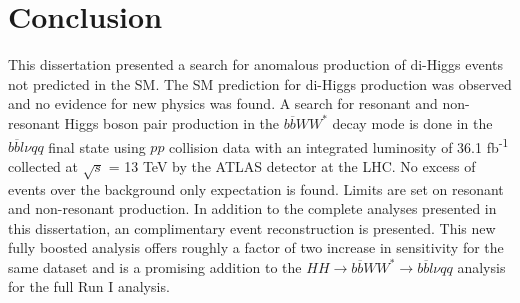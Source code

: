 \chapter{Conclusion}
\label{chap:conc}
This dissertation presented a search for anomalous production of di-Higgs events not predicted in the SM. The SM prediction for di-Higgs production was observed and no evidence for new physics was found.\newline 
A search for resonant and non-resonant Higgs boson pair production in the ${b\overline{b}WW^{*}}$ decay mode is done in the ${b\overline{b}l\nu qq}$ final state using $pp$ collision data with an integrated luminosity of 36.1 fb\textsuperscript{-1} collected at ${\sqrt{s}}$ = 13 TeV by the ATLAS detector at the LHC. No excess of events over the background only expectation is found. Limits are set on resonant and non-resonant production.\newline
\indent In addition to the complete analyses presented in this dissertation, an complimentary event reconstruction is presented. This new fully boosted analysis offers roughly a factor of two increase in sensitivity for the same dataset and is a promising addition to the ${HH\rightarrow b\overline{b}WW^{*}\rightarrow b\overline{b}l\nu qq}$ analysis for the full Run I analysis. \newline
